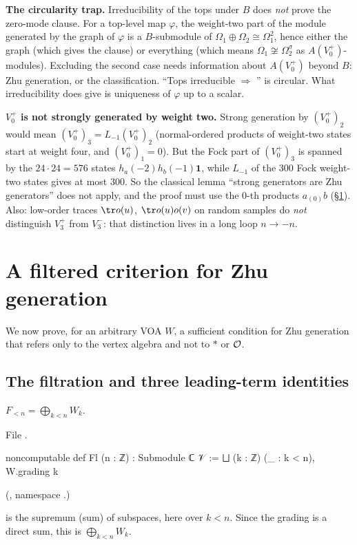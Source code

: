 \begin{warning}
\textbf{The circularity trap.}  Irreducibility of the tops under $B$ does \emph{not} prove the
zero-mode clause.  For a top-level map $\varphi$, the weight-two part of the module generated by the
graph of $\varphi$ is a $B$-submodule of $\Omega_1\oplus\Omega_2\cong\Omega_1^2$, hence either the graph
(which gives the clause) or everything (which means $\Omega_1\not\cong\Omega_2^\sigma$ as $A(V_0^+)$-modules).
Excluding the second case needs information about $A(V_0^+)$ beyond $B$: Zhu generation, or the
classification.  ``Tops irreducible $\Rightarrow$ '' is circular.  What
irreducibility does give is uniqueness of $\varphi$ up to a scalar.
\end{warning}

\begin{warning}
\textbf{$V_0^+$ is not strongly generated by weight two.}  Strong generation by $(V_0^+)_2$ would mean
$(V_0^+)_3=L_{-1}(V_0^+)_2$ (normal-ordered products of weight-two states start at weight four, and
$(V_0^+)_1=0$).  But the Fock part of $(V_0^+)_3$ is spanned by the $24\cdot24=576$ states
$h_a(-2)h_b(-1)\mathbf 1$, while $L_{-1}$ of the $300$ Fock weight-two states gives at most $300$.  So the
classical lemma ``strong generators are Zhu generators'' does not apply, and the proof must use the
$0$-th products $a_{(0)}b$ (\S\ref{ch12:sec:filtered}).  Also: low-order traces $\tr o(u)$, $\tr o(u)o(v)$
on random samples do \emph{not} distinguish $V_3^+$ from $V_3^-$: that distinction lives in a long loop
$n\to-n$.
\end{warning}

\section{A filtered criterion for Zhu generation}\label{ch12:sec:filtered}

We now prove, for an arbitrary VOA $W$, a sufficient condition for Zhu generation that refers only to
the vertex algebra and not to $\ast$ or $\mathcal{O}$.

\subsection{The filtration and three leading-term identities}

\begin{definition}\label{ch12:def:Fl}
$F_{<n}=\bigoplus_{k<n}W_k$.
\end{definition}
File .
\begin{leancode}
noncomputable def Fl (n : ℤ) : Submodule ℂ 𝒱 := ⨆ (k : ℤ) (_ : k < n), W.grading k
\end{leancode}
(, namespace .)
\begin{dictionary}
 is the supremum (sum) of subspaces, here over $k<n$.  Since the grading is a direct sum,
this is $\bigoplus_{k<n}W_k$.
\end{dictionary}

